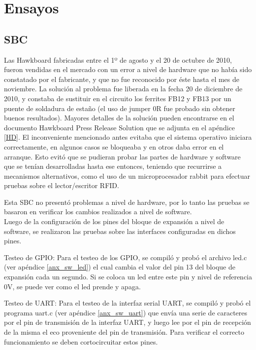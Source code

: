\chapter{Ensayos}

\section{SBC}

Las Hawkboard fabricadas entre el 1º de agosto y el 20 de octubre de 2010, fueron vendidas en el mercado con un error a nivel de hardware que no había sido constatado por el fabricante, y que no fue reconocido por éste hasta el mes de noviembre. La solución al problema fue liberada en la fecha 20 de diciembre de 2010, y constaba de sustituir en el circuito los ferrites FB12 y FB13 por un puente de soldadura de estaño (el uso de jumper 0R fue probado sin obtener buenos resultados). Mayores detalles de la solución pueden encontrarse en el documento Hawkboard Press Release Solution que se adjunta en el apéndice \ref{HD}.
El inconveniente mencionado antes evitaba que el sistema operativo iniciara correctamente, en algunos casos se bloqueaba y en otros daba error en el arranque.
Esto evitó que se pudieran probar las partes de hardware y software que se tenían desarrolladas hasta ese entonces, teniendo que recurrirse a mecanismos alternativos, como el uso de un microprocesador rabbit para efectuar pruebas sobre el lector/escritor RFID.



\bigskip
{}
Esta SBC no presentó problemas a nivel de hardware, por lo tanto las pruebas se basaron en verificar los cambios realizados a nivel de software.\\
Luego de la configuración de los pines del bloque de expansión a nivel de software, se realizaron las pruebas sobre las interfaces configuradas en dichos pines.

\bigskip
{}

Testeo de GPIO: Para el testeo de los GPIO, se compiló y probó el archivo led.c (ver apéndice \ref{anx_sw_led}) el cual cambia el valor del pin 13 del bloque de expansión cada un segundo. Si se coloca un led entre este pin y nivel de referencia 0V, se puede ver como el led prende y apaga.

\bigskip
Testeo de UART: Para el testeo de la interfaz serial UART, se compiló y probó el programa uart.c
(ver apéndice \ref{anx_sw_uart}) que envía una serie de caracteres por el pin de transmisión de la interfaz UART, y luego lee por el pin de recepción de la misma el eco proveniente del pin de transmisión. Para verificar el correcto funcionamiento se deben cortocircuitar estos pines.

